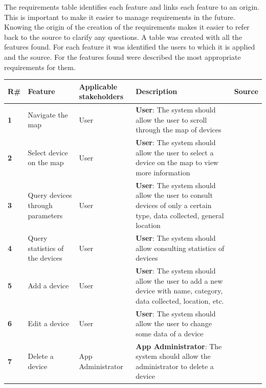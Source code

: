 The requirements table identifies each feature and links each feature to an origin.
\newline
This is important to make it easier to manage requirements in the future.
Knowing the origin of the creation of the requirements makes it easier to
refer back to the source to clarify any questions.
\newline
A table was created with all the features found. For each feature it was identified
the users to which it is applied and the source.
\newline
For the features found were described the most appropriate requirements for
them. \\
\begin{table}[H]
    \centering
    \begin{adjustbox}{width=1.2\textwidth,center=\textwidth}
    \begin{tabular}{|l|p{}|p{}|p{}|p{}|}
        \hline
        \rowcolor{green!20}
        \textbf{R\#} & \textbf{Feature} & \textbf{Applicable stakeholders} & \textbf{Description} & \textbf{Source} \\
        \hline
        \textbf{1} & Navigate the map & User & \textbf{User}: The system should allow the user to scroll through the map of devices &  \\
        \hline
        \textbf{2} & Select device on the map & User & \textbf{User}: The system should allow the user to select a device on the map to view more information &  \\
        \hline
        \textbf{3} & Query devices through parameters & User & \textbf{User}: The system should allow the user to consult devices of only a certain type, data collected, general location &  \\
        \hline
        \textbf{4} & Query statistics of the devices & User & \textbf{User}: The system should allow consulting statistics of devices &  \\
        \hline
        \textbf{5} & Add a device & User & \textbf{User}: The system should allow the user to add a new device with name, category, data collected, location, etc. &  \\
        \hline
        \textbf{6} & Edit a device & User & \textbf{User}: The system should allow the user to change some data of a device &  \\
        \hline
        \textbf{7} & Delete a device & App Administrator & \textbf{App Administrator}: The system should allow the administrator to delete a device &  \\

\end{tabular}
\end{adjustbox}
\end{table}
